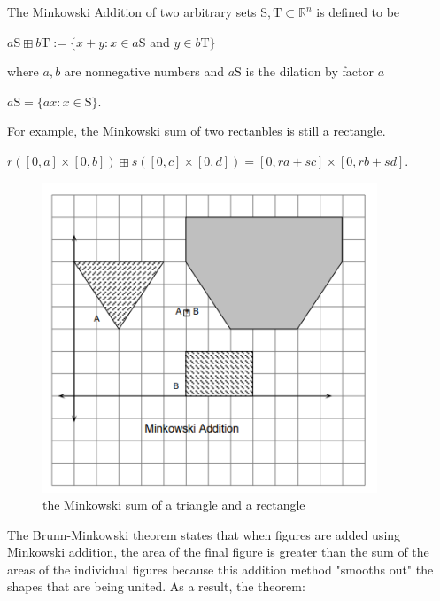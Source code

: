 \documentclass[a4paper]{book}
\numberwithin{theorem}{section}%
\begin{document}
The Minkowski Addition of two arbitrary sets $\mathrm{S},\mathrm{T}\subset\mathbb{R}^{n}$ is defined to be
\begin{center}
    $a\mathrm{S}\boxplus b\mathrm{T}:=\{x+y:x\in a\mathrm{S}$ and $y\in b\mathrm{T}\}$
\end{center}
where $a,b$ are nonnegative numbers and $a\mathrm{S}$ is the dilation by factor $a$
\begin{center}
    $a\mathrm{S}=\{ax:x\in\mathrm{S}\}$.
\end{center}
For example, the Minkowski sum of two rectanbles is still a rectangle.
\begin{center}
    $r([0,a]\times[0,b])\boxplus s([0,c]\times[0,d])=[0,ra+sc]\times[0,rb+sd]$.
\end{center} 
\begin{figure}[hbt!]
    \begin{center}   
        \includegraphics[width=100mm]{BrunnMinkowski1}
        \caption{the Minkowski sum of a triangle and a rectangle}
    \end{center}
\end{figure}\leavevmode

The Brunn-Minkowski theorem states that when figures are added using Minkowski addition, the area of the final figure is greater than the sum of the areas of the individual figures because this addition method "smooths out" the shapes that are being united. As a result, the theorem:
\end{document}
